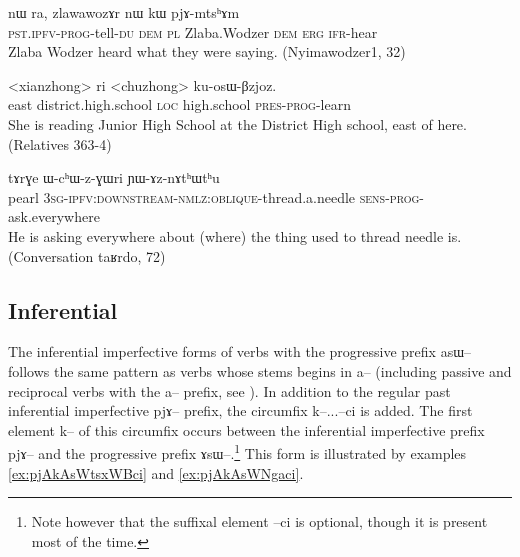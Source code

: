 \documentclass[oldfontcommands,oneside,a4paper,11pt]{article}
\newcommand{\ipa}[1]{{\phon \mbox{#1}}} %
\begin{document}
\begin{exe}
\ex \label{ex:pasWfCAtndZi}
\gll \ipa{pɯ-asɯ-fɕɤt-ndʑi} 	\ipa{nɯ} 	\ipa{ra,} 	\ipa{zlawawozɤr} 	\ipa{nɯ} 	\ipa{kɯ} 	\ipa{pjɤ-mtsʰɤm}\\
\textsc{pst.ipfv-prog}-tell-\textsc{du} \textsc{dem} \textsc{pl}  Zlaba.Wodzer \textsc{dem} \textsc{erg} \textsc{ifr}-hear\\
\glt Zlaba Wodzer heard what they were saying. (Nyimawodzer1, 32)
\end{exe}

\begin{exe}
\ex \label{ex:kosWBzjoz}
\gll \ipa{akɯ} <xianzhong> \ipa{ri} <chuzhong> \ipa{ku-osɯ-βzjoz}. \\
east district.high.school \textsc{loc} high.school \textsc{pres-prog}-learn \\
\glt She is reading Junior High School at the District High school, east of here. (Relatives 363-4)
\end{exe}

 \begin{exe}
\ex \label{ex:YAznAthWthu}
\gll
\ipa{tɤrɣe}  	\ipa{ɯ-cʰɯ-z-ɣɯri}  	\ipa{ɲɯ-ɤz-nɤtʰɯtʰu}  	 \\
pearl \textsc{3sg-ipfv:downstream-nmlz:oblique}-thread.a.needle \textsc{sens-prog}-ask.everywhere \\
\glt He is asking everywhere about (where) the thing used to thread needle is. (Conversation \ipa{taʁrdo}, 72)
\end{exe}


\subsection{Inferential}

The inferential imperfective forms of verbs with the progressive prefix \ipa{asɯ--} follows the same pattern as verbs whose stems begins in \ipa{a--} (including passive and reciprocal verbs with the \ipa{a--} prefix, see \citealt{jacques07passif}). In addition to the regular past inferential imperfective \ipa{pjɤ--} prefix, the circumfix \ipa{k--}...\ipa{--ci} is added. The first element \ipa{k--} of this circumfix occurs between the inferential imperfective prefix \ipa{pjɤ--} and the progressive prefix \ipa{ɤsɯ--}.\footnote{Note however that the suffixal element \ipa{--ci} is optional, though it is present most of the time.} This form is illustrated by examples \ref{ex:pjAkAsWtsxWBci} and \ref{ex:pjAkAsWNgaci}.
\end{document}
